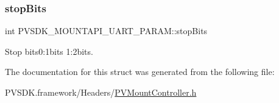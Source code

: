 \subsubsection{\texorpdfstring{stop\+Bits}{stopBits}}
{\footnotesize\ttfamily int P\+V\+S\+D\+K\+\_\+\+M\+O\+U\+N\+T\+A\+P\+I\+\_\+\+U\+A\+R\+T\+\_\+\+P\+A\+R\+A\+M\+::stop\+Bits}



Stop bits0\+:1bits 1\+:2bits. 



The documentation for this struct was generated from the following file\+:\begin{DoxyCompactItemize}
\item 
P\+V\+S\+D\+K.\+framework/\+Headers/\hyperlink{_p_v_mount_controller_8h}{P\+V\+Mount\+Controller.\+h}\end{DoxyCompactItemize}
